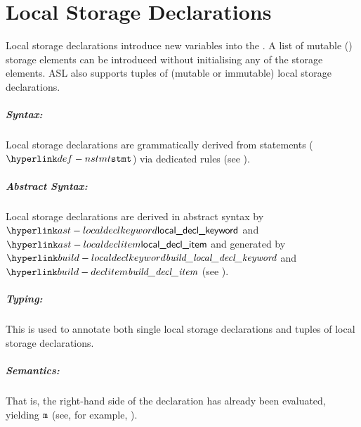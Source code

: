 \chapter{Local Storage Declarations\label{chap:LocalStorageDeclarations}}

Local storage declarations introduce new variables into the \localstaticenvironmentterm.
A list of mutable (\Tvar) storage elements can be introduced without initialising any
of the storage elements.
ASL also supports tuples of (mutable or immutable) local storage declarations.


\ChapterOutline

\paragraph{Syntax:} Local storage declarations are grammatically derived from statements ($\Nstmt$)
  via dedicated rules (see ).

\paragraph{Abstract Syntax:} Local storage declarations are derived in abstract syntax by $\localdeclkeyword$ and $\localdeclitem$ and generated by $\buildlocaldeclkeyword$ and $\builddeclitem$
(see ).

\paragraph{Typing:}

This is used to annotate both single local storage declarations and tuples of local storage declarations.

\paragraph{Semantics:}
That is, the right-hand side of the declaration
has already been evaluated, yielding $\texttt{m}$ (see, for example, ).

